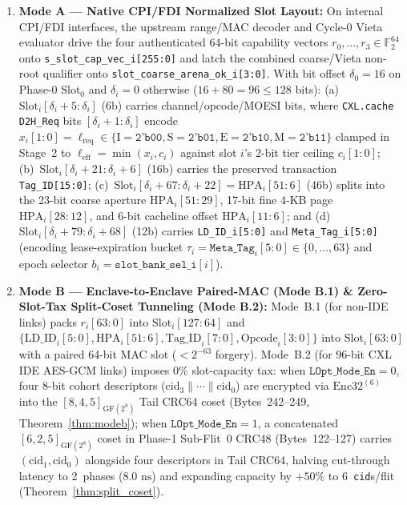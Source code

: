 \documentclass[10pt,twocolumn]{article}
\theoremstyle{spectralthm}
\begin{document}
\begin{enumerate}
  \item \textbf{Mode A --- Native CPI/FDI Normalized Slot Layout:} On internal CPI/FDI interfaces, the upstream range/MAC decoder and Cycle-0 Vieta evaluator drive the four authenticated 64-bit capability vectors $r_0,\ldots,r_3 \in \mathbb{F}_2^{64}$ onto \texttt{s\_slot\_cap\_vec\_i[255:0]} and latch the combined coarse/Vieta non-root qualifier onto \texttt{slot\_coarse\_arena\_ok\_i[3:0]}. With bit offset $\delta_0 = 16$ on Phase-0 $\mathrm{Slot}_0$ and $\delta_i = 0$ otherwise ($16 + 80 = 96 \le 128$ bits): (a)~$\mathrm{Slot}_i[\delta_i+5:\delta_i]$ (6b) carries channel/opcode/MOESI bits, where \texttt{CXL.cache D2H\_Req} bits $[\delta_i+1:\delta_i]$ encode $x_i[1:0] = \ell_{\mathrm{req}} \in \{\mathrm{I}=\texttt{2'b00}, \mathrm{S}=\texttt{2'b01}, \mathrm{E}=\texttt{2'b10}, \mathrm{M}=\texttt{2'b11}\}$ clamped in Stage~2 to $\ell_{\mathrm{eff}} = \min(x_i, c_i)$ against slot $i$'s 2-bit tier ceiling $c_i[1:0]$; (b)~$\mathrm{Slot}_i[\delta_i+21:\delta_i+6]$ (16b) carries the preserved transaction \texttt{Tag\_ID[15:0]}; (c)~$\mathrm{Slot}_i[\delta_i+67:\delta_i+22] = \mathrm{HPA}_i[51:6]$ (46b) splits into the 23-bit coarse aperture $\mathrm{HPA}_i[51:29]$, 17-bit fine 4-KB page $\mathrm{HPA}_i[28:12]$, and 6-bit cacheline offset $\mathrm{HPA}_i[11:6]$; and (d)~$\mathrm{Slot}_i[\delta_i+79:\delta_i+68]$ (12b) carries \texttt{LD\_ID\_i[5:0]} and \texttt{Meta\_Tag\_i[5:0]} (encoding lease-expiration bucket $\tau_i = \texttt{Meta\_Tag}_i[5:0] \in \{0,\ldots,63\}$ and epoch selector $b_i = \texttt{slot\_bank\_sel\_i}[i]$).
  \item \textbf{Mode B --- Enclave-to-Enclave Paired-MAC (Mode B.1) \& Zero-Slot-Tax Split-Coset Tunneling (Mode B.2):} Mode~B.1 (for non-IDE links) packs $r_i[63:0]$ into $\mathrm{Slot}_i[127:64]$ and $\{\mathrm{LD\_ID}_i[5:0], \mathrm{HPA}_i[51:6], \mathrm{Tag\_ID}_i[7:0], \mathrm{Opcode}_i[3:0]\}$ into $\mathrm{Slot}_i[63:0]$ with a paired 64-bit MAC slot ($<2^{-63}$ forgery). Mode~B.2 (for 96-bit CXL IDE AES-GCM links) imposes $0\%$ slot-capacity tax: when $\texttt{LOpt\_Mode\_En} = 0$, four 8-bit cohort descriptors ($\mathrm{cid}_3 \parallel \cdots \parallel \mathrm{cid}_0$) are encrypted via $\mathrm{Enc32}^{(6)}$ into the $[8,4,5]_{\mathrm{GF}(2^8)}$ Tail CRC64 coset (Bytes~242--249, Theorem~\ref{thm:modeb}); when $\texttt{LOpt\_Mode\_En} = 1$, a concatenated $[6,2,5]_{\mathrm{GF}(2^8)}$ coset in Phase-1 Sub-Flit~0 CRC48 (Bytes~122--127) carries $(\mathrm{cid}_1, \mathrm{cid}_0)$ alongside four descriptors in Tail CRC64, halving cut-through latency to 2~phases ($8.0\text{~ns}$) and expanding capacity by $+50\%$ to 6~\texttt{cid}s/flit (Theorem~\ref{thm:split_coset}).

\end{enumerate}
\end{document}
